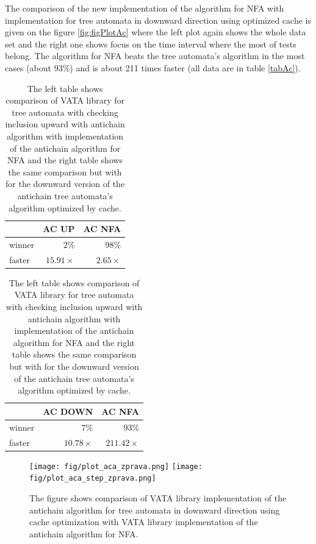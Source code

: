 The comparison of the new implementation of the algorithm for NFA with implementation for tree automata in downward direction using optimized cache
is given on the figure 
\ref{fig:figPlotAc} where the left plot again shows the whole data set and the right one shows focus on the time interval where the most of tests belong.
The algorithm for NFA beats the tree automata's algorithm in the most cases (about 93\%) and is about 211 times faster (all data are in table \ref{tabAc}).

\begin{table}[bt]
\begin{center}
\parbox{.45\linewidth}{
  \begin{tabular}[scale=0.3]{ | l | r | r |}
   \hline
    & \textbf{AC UP} & \textbf{AC NFA} \\ \hline \hline
    winner & $2\%$ & $98\%$ \\ \hline
    faster & $15.91\times$ & $2.65\times$ \\ \hline
   \end{tabular}
}
   \parbox{.45\linewidth}{
  \begin{tabular}{ | l | r | r |}
   \hline
    & \textbf{AC DOWN} & \textbf{AC NFA} \\ \hline \hline
    winner & $7\%$ & $93\%$ \\ \hline
    faster & $10.78\times$ & $211.42\times$ \\ \hline
   \end{tabular}
   }
   \caption{The left table shows comparison of VATA library for tree automata with checking inclusion upward with antichain algorithm with
       implementation of the antichain algorithm for NFA and
   the right table shows the same comparison but with for the downward version of the antichain tree automata's algorithm optimized
   by cache.}
   \label{tabAac}
\end{center}
\end{table}



\begin{figure}[bt]
\begin{center}
\texttt{[image: fig/plot\_aca\_zprava.png]}
\texttt{[image: fig/plot\_aca\_step\_zprava.png]}
\caption{The figure shows
 comparison of VATA library implementation of the antichain algorithm for tree automata in downward direction using cache optimization 
 with VATA library implementation of the antichain algorithm for NFA.}
\label{fig:figPlotAca}
\end{center}
\end{figure}

